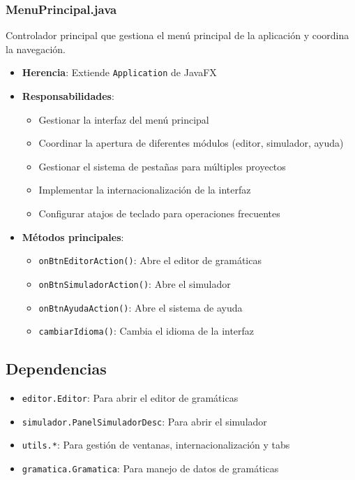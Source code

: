 \subsubsection{MenuPrincipal.java}

Controlador principal que gestiona el menú principal de la aplicación y coordina la navegación.

\begin{itemize}
    \item \textbf{Herencia}: Extiende \texttt{Application} de JavaFX
    \item \textbf{Responsabilidades}:
    \begin{itemize}
        \item Gestionar la interfaz del menú principal
        \item Coordinar la apertura de diferentes módulos (editor, simulador, ayuda)
        \item Gestionar el sistema de pestañas para múltiples proyectos
        \item Implementar la internacionalización de la interfaz
        \item Configurar atajos de teclado para operaciones frecuentes
    \end{itemize}
    \item \textbf{Métodos principales}:
    \begin{itemize}
        \item \texttt{onBtnEditorAction()}: Abre el editor de gramáticas
        \item \texttt{onBtnSimuladorAction()}: Abre el simulador
        \item \texttt{onBtnAyudaAction()}: Abre el sistema de ayuda
        \item \texttt{cambiarIdioma()}: Cambia el idioma de la interfaz
    \end{itemize}
\end{itemize}

\subsection{Dependencias}

\begin{itemize}
    \item \texttt{editor.Editor}: Para abrir el editor de gramáticas
    \item \texttt{simulador.PanelSimuladorDesc}: Para abrir el simulador
    \item \texttt{utils.*}: Para gestión de ventanas, internacionalización y tabs
    \item \texttt{gramatica.Gramatica}: Para manejo de datos de gramáticas
\end{itemize}

